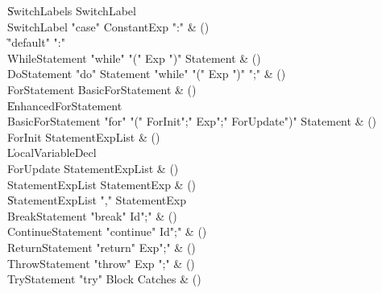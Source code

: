 \begin{bbgrammar}

    \| SwitchLabels SwitchLabel\\
 SwitchLabel  \label{prod:SwitchLabel}  \: \xcd"case" ConstantExp \xcd":" & ()\\
    \| \xcd"default" \xcd":"\\
 WhileStatement  \label{prod:WhileStatement}  \: \xcd"while" \xcd"(" Exp \xcd")" Statement & ()\\
 DoStatement  \label{prod:DoStatement}  \: \xcd"do" Statement \xcd"while" \xcd"(" Exp \xcd")" \xcd";" & ()\\
 ForStatement  \label{prod:ForStatement}  \: BasicForStatement & ()\\
    \| EnhancedForStatement\\
 BasicForStatement  \label{prod:BasicForStatement}  \: \xcd"for" \xcd"(" ForInit\opt \xcd";" Exp\opt \xcd";" ForUpdate\opt \xcd")" Statement & ()\\
 ForInit  \label{prod:ForInit}  \: StatementExpList & ()\\
    \| LocalVariableDecl\\
 ForUpdate  \label{prod:ForUpdate}  \: StatementExpList & ()\\
 StatementExpList  \label{prod:StatementExpList}  \: StatementExp & ()\\
    \| StatementExpList \xcd"," StatementExp\\
 BreakStatement  \label{prod:BreakStatement}  \: \xcd"break" Id\opt \xcd";" & ()\\
 ContinueStatement  \label{prod:ContinueStatement}  \: \xcd"continue" Id\opt \xcd";" & ()\\
 ReturnStatement  \label{prod:ReturnStatement}  \: \xcd"return" Exp\opt \xcd";" & ()\\
 ThrowStatement  \label{prod:ThrowStatement}  \: \xcd"throw" Exp \xcd";" & ()\\
 TryStatement  \label{prod:TryStatement}  \: \xcd"try" Block Catches & ()\\

\end{bbgrammar}
